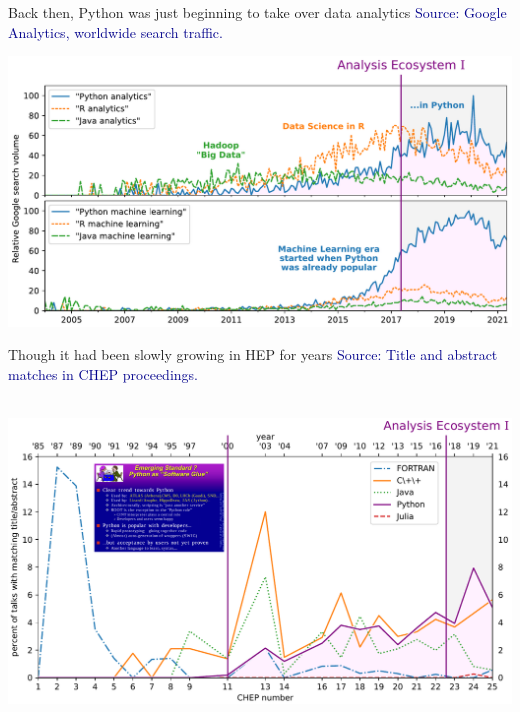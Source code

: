 \documentclass[aspectratio=169]{beamer}
\begin{document}
\begin{frame}{Back then, Python was just beginning to take over data analytics}
\vspace{0.25 cm}
\textcolor{darkblue}{Source: Google Analytics, worldwide search traffic.}

\vspace{-0.3 cm}
\includegraphics[width=\linewidth]{PLOTS/analytics-by-language.pdf}
\end{frame}

\begin{frame}{Though it had been slowly growing in HEP for years}
\vspace{0.25 cm}
\textcolor{darkblue}{Source: Title and abstract matches in CHEP proceedings.}

\vspace{-0.3 cm}
\mbox{ } \hfill \includegraphics[width=0.95\linewidth]{PLOTS/chep-papers-language-2.pdf} \hfill \mbox{ }
\end{frame}
\end{document}
